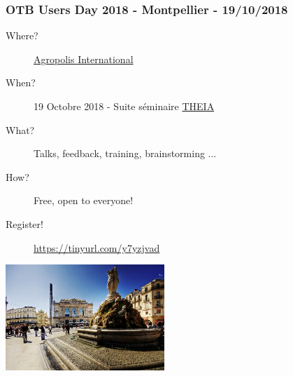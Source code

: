 \documentclass[8pt]{beamer}
\begin{document}
\begin{frame}
  \frametitle{OTB Users Day 2018 - Montpellier - 19/10/2018}
  \begin{description}
  \item[Where?] \href{http://www.agropolis.fr/pratique/locaux.php}{Agropolis International}
  \item[When?] 19 Octobre 2018 - Suite séminaire \href{http://theia2018.sciencesconf.org}{THEIA}
  \item[What?] Talks, feedback, training, brainstorming ...
  \item[How?] Free, open to everyone!
  \item[Register!] \url{https://tinyurl.com/y7yzjvad}
  \end{description}
  \begin{center}
    \includegraphics[width=0.45\textwidth]{../foss4gfr-2018/images/montpellier.jpg}
  \end{center}  
\end{frame}
\end{document}
